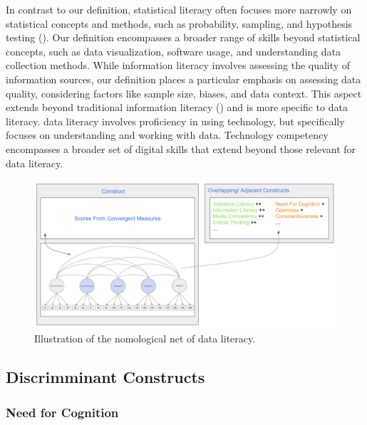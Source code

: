 \documentclass[
  12pt,
  a4paper,
  twoside]{article}
\begin{document}
In contrast to our definition, statistical literacy often focuses more narrowly on statistical concepts and methods, such as probability, sampling, and hypothesis testing (). Our definition encompasses a broader range of skills beyond statistical concepts, such as data visualization, software usage, and understanding data collection methods. While information literacy involves assessing the quality of information sources, our definition places a particular emphasis on assessing data quality, considering factors like sample size, biases, and data context. This aspect extends beyond traditional information literacy () and is more specific to data literacy. data literacy involves proficiency in using technology, but specifically focuses on understanding and working with data. Technology competency encompasses a broader set of digital skills that extend beyond those relevant for data literacy.

\begin{figure}

{\centering \includegraphics[width=1\linewidth]{images/DL_Nomological_Net} 

}

\caption{Illustration of the nomological net of data literacy.  }\label{fig:workflow}
\end{figure}

\subsection{Discrimminant Constructs}\label{discrimminant-constructs}

\subsubsection{Need for Cognition}\label{need-for-cognition}
\end{document}
